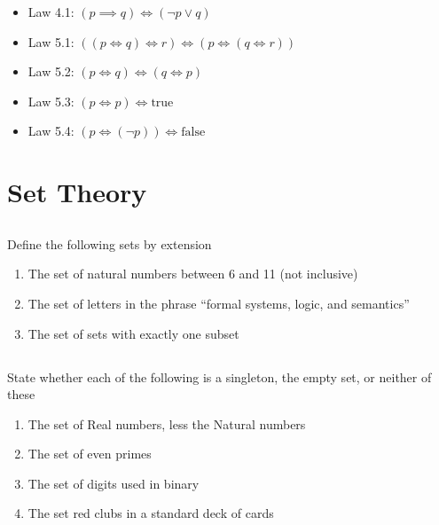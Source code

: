 \documentclass[twocolumn]{article}
\begin{document}
\begin{itemize}
    \item Law 4.1: $ (p \implies q) \Longleftrightarrow ( \neg p \vee q)$

    \item Law 5.1: $((p \Longleftrightarrow q) \Longleftrightarrow r) \Longleftrightarrow (p \Longleftrightarrow (q \Longleftrightarrow r))$
    \item Law 5.2: $(p \Longleftrightarrow q) \Longleftrightarrow (q \Longleftrightarrow p)$
    \item Law 5.3: $(p \Longleftrightarrow p) \Longleftrightarrow \text{true}$
    \item Law 5.4: $(p \Longleftrightarrow (\neg p)) \Longleftrightarrow \text{false}$
\end{itemize}

\clearpage
\section{Set Theory}

\subsection{}

    Define the following sets by extension

    \begin{enumerate}
        \item The set of natural numbers between 6 and 11 (not inclusive)
        \item The set of letters in the phrase ``formal systems, logic, and semantics''
        \item The set of sets with exactly one subset
    \end{enumerate}

\subsection{}

    State whether each of the following is a singleton, the empty set, or neither of these

    \begin{enumerate}
        \item The set of Real numbers, less the Natural numbers
        \item The set of even primes
        \item The set of digits used in binary
        \item The set red clubs in a standard deck of cards
    \end{enumerate}
\end{document}
